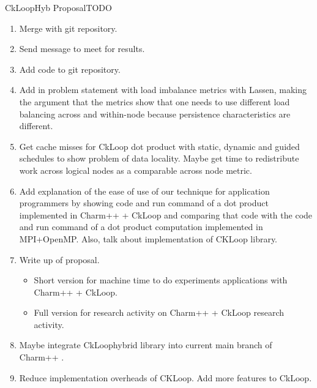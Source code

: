 \begin{frame}{CkLoopHyb Proposal}{TODO}

\begin{enumerate}
\conti
\item \small Merge with git repository.
\item \small Send message to meet for results.
\item \small Add code to git repository.
\item \small Add in problem statement with load imbalance metrics with Lassen, making the argument that the metrics show that one needs to use different load balancing across and within-node because persistence characteristics are different.
\item \small Get cache misses for CkLoop dot product with static, dynamic and guided schedules to show problem of data locality. Maybe get time to redistribute work across logical nodes as a comparable across node metric. 
\item \small Add explanation of the ease of use of our technique for application programmers by showing code and run command of a dot product implemented in Charm++ + CkLoop and comparing that code with the code and run command of a dot product computation implemented in MPI+OpenMP. Also, talk about implementation of CKLoop library. 
\item Write up of proposal. 
\begin{itemize}
\small \item \small Short version for machine time to do experiments  applications with Charm++ + CkLoop. 
 \item \small Full version for research activity on Charm++ + CkLoop research activity. 
\end{itemize}

\item \small  Maybe integrate CkLoophybrid library into current main branch of Charm++ . 
\item  \small Reduce implementation overheads of CKLoop. Add more features to CkLoop.
\end{enumerate}

\end{frame}


